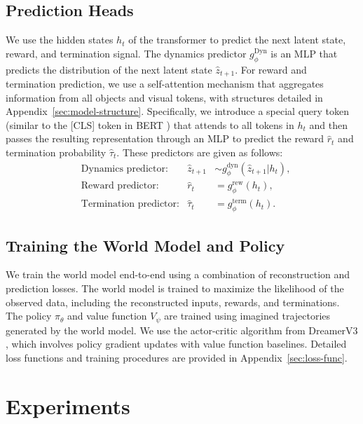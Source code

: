 \documentclass{article} %
\begin{document}
\subsection{Prediction Heads}
We use the hidden states $h_t$ of the transformer to predict the next latent state, reward, and termination signal. The dynamics predictor $g^{\mathrm{Dyn}}_\phi$ is an MLP that predicts the distribution of the next latent state $\hat{z}_{t+1}$. For reward and termination prediction, we use a self-attention mechanism that aggregates information from all objects and visual tokens, with structures detailed in Appendix~\ref{sec:model-structure}. Specifically, we introduce a special query token (similar to the [CLS] token in BERT \citep{devlin_bert_2019}) that attends to all tokens in $h_t$ and then passes the resulting representation through an MLP to predict the reward $\hat{r}_t$ and termination probability $\hat{\tau}_t$. These predictors are given as follows:
\begin{equation} \label{eq:predictors}
\begin{aligned}
&\text{Dynamics predictor:} & \hat{z}_{t+1} &\sim g^{\mathrm{dyn}}_\phi(\hat{z}_{t+1}|h_t),\\
&\text{Reward predictor:} & \hat{r}_t &= g^{\mathrm{rew}}_\phi(h_t),\\
&\text{Termination predictor:} &  \hat{\tau}_t &= g^{\mathrm{term}}_\phi(h_t).
\end{aligned}
\end{equation}

\subsection{Training the World Model and Policy}

We train the world model end-to-end using a combination of reconstruction and prediction losses. The world model is trained to maximize the likelihood of the observed data, including the reconstructed inputs, rewards, and terminations. The policy $\pi_\theta$ and value function $V_\psi$ are trained using imagined trajectories generated by the world model. We use the actor-critic algorithm from DreamerV3 \citep{hafner_mastering_2023, zhang_storm_2023, micheli_transformers_2022, robine_transformer-based_2022}, which involves policy gradient updates with value function baselines. Detailed loss functions and training procedures are provided in Appendix~\ref{sec:loss-func}.


\section{Experiments} \label{sec:exps}
\end{document}
